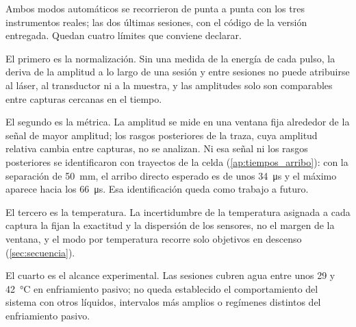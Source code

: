 Ambos modos automáticos se recorrieron de punta a punta con los tres
instrumentos reales; las dos últimas sesiones, con el código de la
versión entregada. Quedan cuatro límites que conviene declarar.

El primero es la normalización. Sin una medida de la energía de cada
pulso, la deriva de la amplitud a lo largo de una sesión y entre
sesiones no puede atribuirse al láser, al transductor ni a la muestra,
y las amplitudes solo son comparables entre capturas cercanas en el
tiempo.

El segundo es la métrica. La amplitud se mide en una ventana fija
alrededor de la señal de mayor amplitud; los rasgos posteriores de la
traza, cuya amplitud relativa cambia entre capturas, no se analizan. Ni
esa señal ni los rasgos posteriores se identificaron con trayectos de
la celda (\cref{ap:tiempos_arribo}): con la separación de
\SI{50}{\milli\meter}, el arribo directo esperado es de unos
\SI{34}{\micro\second} y el máximo aparece hacia los
\SI{66}{\micro\second}. Esa identificación queda como trabajo a
futuro.

El tercero es la temperatura. La incertidumbre de la temperatura
asignada a cada captura la fijan la exactitud y la dispersión de los
sensores, no el margen de la ventana, y el modo por temperatura recorre
solo objetivos en descenso (\cref{sec:secuencia}).

El cuarto es el alcance experimental. Las sesiones cubren agua entre
unos 29 y \SI{42}{\celsius} en enfriamiento pasivo; no queda establecido
el comportamiento del sistema con otros líquidos, intervalos más
amplios o regímenes distintos del enfriamiento pasivo.
